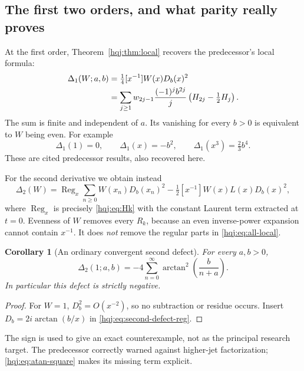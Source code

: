 \documentclass[11pt,letterpaper]{article}
\numberwithin{equation}{section}
\newtheorem{corollary}[theorem]{Corollary}
\theoremstyle{definition}
\newcommand{\Reg}{\operatorname{Reg}}
\begin{document}
\subsection{The first two orders, and what parity really proves}
At the first order, Theorem~\ref{hqj:thm:local} recovers the predecessor's
local formula:
\begin{align}
\Delta_1(W;a,b)
&=\tfrac14[x^{-1}]W(x)D_b(x)^2\notag\\
&=\sum_{j\ge1}w_{2j-1}\frac{(-1)^j b^{2j}}j
\left(H_{2j}-\tfrac12H_j\right).
\label{hqj:eq:first-defect}
\end{align}
The sum is finite and independent of $a$. Its vanishing for every $b>0$
is equivalent to $W$ being even. For example
\[
\Delta_1(1)=0,\qquad \Delta_1(x)=-b^2,\qquad
\Delta_1(x^3)=\tfrac23b^4.
\]
These are cited predecessor results, also recovered here.

For the second derivative we obtain instead
\begin{equation}\label{hqj:eq:second-defect-reg}
\Delta_2(W)=\Reg_x\sum_{n\ge0}W(x_n)D_b(x_n)^2
-\tfrac12[x^{-1}]W(x)L(x)D_b(x)^2,
\end{equation}
where $\Reg_x$ is precisely \eqref{hqj:eq:Hk} with the constant Laurent
term extracted at $t=0$. Evenness of $W$ removes every $R_k$, because
an even inverse-power expansion cannot contain $x^{-1}$. It does
\emph{not} remove the regular parts in \eqref{hqj:eq:all-local}.

\begin{corollary}[An ordinary convergent second defect]\label{hqj:cor:atan}
For every $a,b>0$,
\begin{equation}\label{hqj:eq:atan-square}
\boxed{\Delta_2(1;a,b)=-4\sum_{n=0}^{\infty}
\arctan^2\!\left(\frac{b}{n+a}\right).}
\end{equation}
In particular this defect is strictly negative.
\end{corollary}
\begin{proof}
For $W=1$, $D_b^2=O(x^{-2})$, so no subtraction or residue occurs.
Insert $D_b=2i\arctan(b/x)$ in \eqref{hqj:eq:second-defect-reg}.
\end{proof}
The sign is used to give an exact counterexample, not as the principal
research target. The predecessor correctly warned against higher-jet
factorization; \eqref{hqj:eq:atan-square} makes its missing term explicit.
\end{document}
